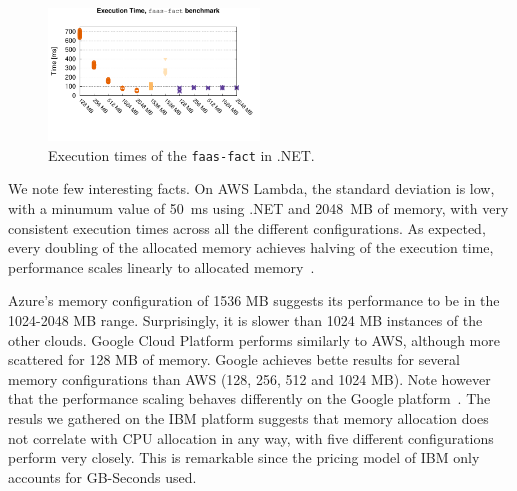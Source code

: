 \begin{figure}[!t]
\centering
\includegraphics[width=0.5\textwidth, trim={0 40 0 0}]{bilder/general_dotnet/cpufact.pdf}
\caption{Execution times of the \texttt{faas-fact} in .NET.}
\label{fig:general_dotnet_plot}
\end{figure}

We note few interesting facts.
On \gls{AWS} Lambda, the standard deviation is low, with a minumum value of 50~ms using .NET and  2048~MB of memory, with very consistent execution times across all the different configurations. 
As expected, every doubling of the allocated memory achieves halving of the execution time, performance scales linearly to allocated memory~\cite{AWSLambdaConfig}. 

Azure's memory configuration of 1536 \gls{MB} suggests its performance to be in the 1024-2048 \gls{MB} range.
Surprisingly, it is slower than 1024 \gls{MB} instances of the other clouds.  
Google Cloud Platform performs similarly to \gls{AWS}, although more scattered for 128 \gls{MB} of memory. 
Google achieves bette results for several memory configurations than \gls{AWS} (128, 256, 512 and 1024 \gls{MB}). %
Note however that the performance scaling behaves differently on the Google platform~\cite{GoogleFunctionsPricing}.
The resuls we gathered on the \gls{IBM} platform suggests that memory allocation does not correlate with \gls{CPU} allocation in any way, with five different configurations perform very closely. 
This is remarkable since the pricing model of \gls{IBM} only accounts for GB-Seconds used. 

